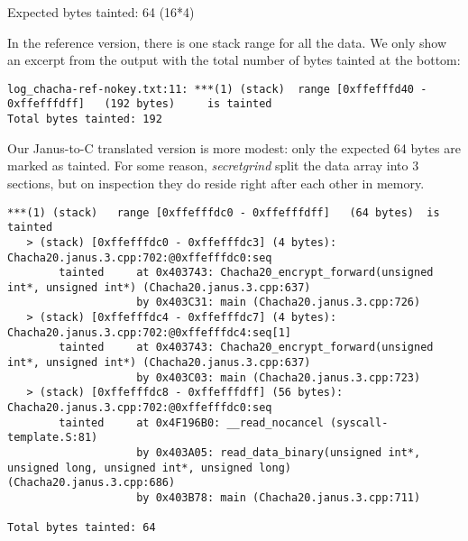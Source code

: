 \documentclass[a4paper,10pt,openright]{memoir}
\newcommand{\term}[1]{\textit{#1}}
\begin{document}

Expected bytes tainted: 64 (16*4)



In the reference version, there is one stack range for all the data. We 
only show an excerpt from the output with the total number of bytes 
tainted at the bottom:

\begin{verbatim}
log_chacha-ref-nokey.txt:11: ***(1) (stack)	 range [0xffefffd40 - 0xffefffdff]	 (192 bytes)	 is tainted
Total bytes tainted: 192
\end{verbatim}

Our Janus-to-C translated version is more modest: only the expected 64 
bytes are marked as tainted. For some reason, \term{secretgrind} split 
the data array into 3 sections, but on inspection they do reside right 
after each other in memory.

\begin{verbatim}
***(1) (stack)	 range [0xffefffdc0 - 0xffefffdff]	 (64 bytes)	 is tainted
   > (stack) [0xffefffdc0 - 0xffefffdc3] (4 bytes): Chacha20.janus.3.cpp:702:@0xffefffdc0:seq
        tainted     at 0x403743: Chacha20_encrypt_forward(unsigned int*, unsigned int*) (Chacha20.janus.3.cpp:637)
                    by 0x403C31: main (Chacha20.janus.3.cpp:726)
   > (stack) [0xffefffdc4 - 0xffefffdc7] (4 bytes): Chacha20.janus.3.cpp:702:@0xffefffdc4:seq[1]
        tainted     at 0x403743: Chacha20_encrypt_forward(unsigned int*, unsigned int*) (Chacha20.janus.3.cpp:637)
                    by 0x403C03: main (Chacha20.janus.3.cpp:723)
   > (stack) [0xffefffdc8 - 0xffefffdff] (56 bytes): Chacha20.janus.3.cpp:702:@0xffefffdc0:seq
        tainted     at 0x4F196B0: __read_nocancel (syscall-template.S:81)
                    by 0x403A05: read_data_binary(unsigned int*, unsigned long, unsigned int*, unsigned long) (Chacha20.janus.3.cpp:686)
                    by 0x403B78: main (Chacha20.janus.3.cpp:711)

Total bytes tainted: 64
\end{verbatim}
\end{document}
